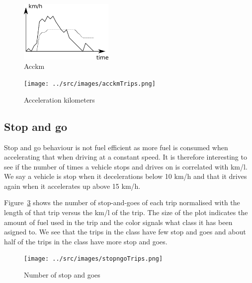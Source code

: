 \begin{figure}[htb]
\centering
\includegraphics[width=0.4\textwidth]{../images/acckm.png}
\caption{Acckm}
\label{fig:acckm}
\end{figure}

\begin{figure}
\centering
\texttt{[image: ../src/images/acckmTrips.png]}
\caption{Acceleration kilometers}
\label{fig:acckmTrips}
\end{figure}

\subsection{Stop and go}
Stop and go behaviour is not fuel efficient as more fuel is consumed when accelerating that when driving at a constant speed.
It is therefore interesting to see if the number of times a vehicle stops and drives on is correlated with km/l.
We say a vehicle is stop when it decelerations below 10 km/h and that it drives again when it accelerates up above 15 km/h.


Figure~\ref{fig:stopngoTrips} shows the number of stop-and-goes of each trip normalised with the length of that trip versus the km/l of the trip.
The size of the plot indicates the amount of fuel used in the trip and the color signals what class it has been asigned to.
We see that the trips in the \fuelHigh class have few stop and goes and about half of the trips in the \fuelMedium class have more stop and goes.

\begin{figure}
\centering
\texttt{[image: ../src/images/stopngoTrips.png]}
\caption{Number of stop and goes}
\label{fig:stopngoTrips}
\end{figure}
